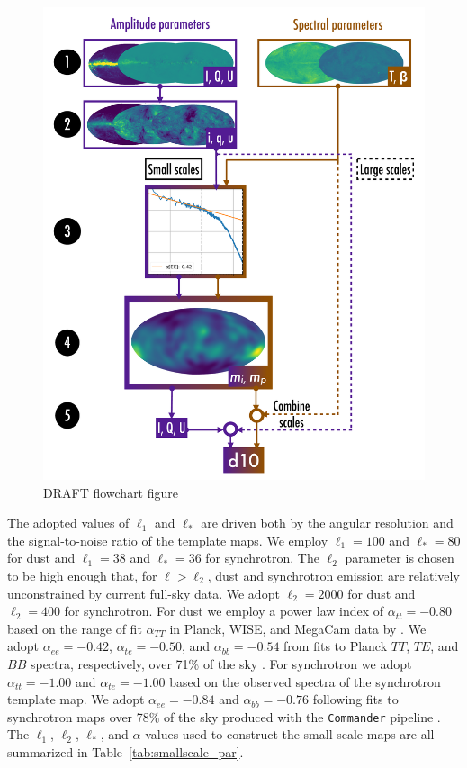 \documentclass[twocolumn]{aastex631}
\begin{document}
\begin{figure}
    \includegraphics[width=\textwidth]{figures/draft_flowchart_fig_larger_scalesep2.pdf}
    \caption{DRAFT flowchart figure}
    \label{fig:flowchart}
\end{figure}
  
The adopted values of $\ell_1$ and $\ell_*$ are driven both by the angular resolution and the signal-to-noise ratio of the template maps. We employ $\ell_1=100$ and $\ell_*=80$ for dust and $\ell_1=38$ and $\ell_*=36$ for synchrotron. The $\ell_2$ parameter is chosen to be high enough that, for $\ell > \ell_2$, dust and synchrotron emission are relatively unconstrained by current full-sky data. We adopt  $\ell_2=2000$ for dust and $\ell_2 = 400$ for synchrotron. For dust we employ a power law index of $\alpha_{tt} = -0.80$ based on the range of fit $\alpha_{TT}$ in Planck, WISE, and MegaCam data by \citet{Miville-Deschenes:2016}. We adopt $\alpha_{ee} = -0.42$, $\alpha_{te} = -0.50$, and $\alpha_{bb} = -0.54$ from fits to Planck $TT$, $TE$, and $BB$ spectra, respectively, over 71\% of the sky \citep{planck2016-l11A}. For synchrotron we adopt $\alpha_{tt} = -1.00$ and $\alpha_{te} = -1.00$ based on the observed spectra of the synchrotron template map. We adopt $\alpha_{ee} = -0.84$ and $\alpha_{bb} = -0.76$ following fits to synchrotron maps over 78\% of the sky produced with the \texttt{Commander} pipeline \citep{planck2016-l04}. The $\ell_1$, $\ell_2$, $\ell_*$, and $\alpha$ values used to construct the small-scale maps are all summarized in Table~\ref{tab:smallscale_par}.
\end{document}
